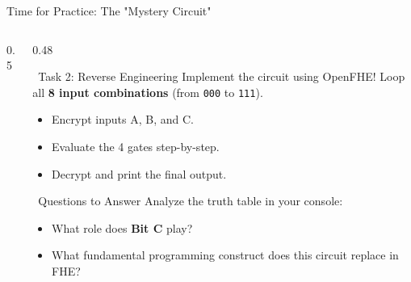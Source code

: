 \documentclass[aspectratio=169, 10pt]{beamer}
\begin{document}
\begin{frame}{Time for Practice: The "Mystery Circuit"}
\begin{columns}[T]
\begin{column}{0.5\textwidth}
\begin{center}
{
    }
    \end{center}
\end{column}

\begin{column}{0.48\textwidth}
    \begin{block}{\faUserSecret \ Task 2: Reverse Engineering}
        \vspace*{0.5ex}
        \footnotesize
        Implement the circuit using OpenFHE! Loop all \textbf{8 input combinations} (from \texttt{000} to \texttt{111}).
        \begin{itemize}
            \setlength{\itemsep}{0pt}
            \item Encrypt inputs A, B, and C.
            \item Evaluate the 4 gates step-by-step.
            \item Decrypt and print the final output.
        \end{itemize}
    \end{block}
    
    \begin{exampleblock}{\faQuestionCircle \ Questions to Answer}
        \vspace*{0.5ex}
        \footnotesize
        Analyze the truth table in your console:
        \begin{itemize}
            \setlength{\itemsep}{0.1cm}
            \item[\textbf{1.}] What role does \textbf{Bit C} play?
            \item[\textbf{2.}] What fundamental programming construct does this circuit replace in FHE?
        \end{itemize}
    \end{exampleblock}
\end{column}

\end{columns}
\end{frame}
\end{document}
